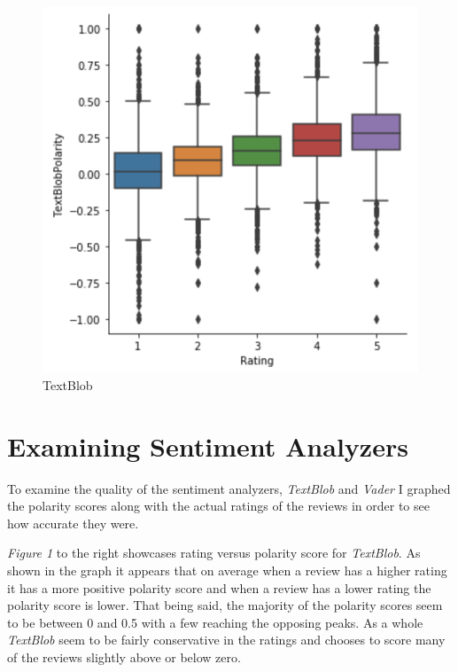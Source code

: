\documentclass[a4paper, 11pt]{article}
\begin{document}
\begin{figure} %
    \vspace{7mm}
    \centering
    \caption{TextBlob}
    \includegraphics[width=\linewidth, trim=1 1 1 1,clip]{SentimentTextBlob.png}
\end{figure}

\section*{Examining Sentiment Analyzers}
To examine the quality of the sentiment analyzers, \emph{TextBlob} and \emph{Vader} I graphed the polarity scores along with the actual ratings of the reviews in order to see how accurate they were. 

\noindent
\emph{Figure 1} to the right showcases rating versus polarity score for \emph{TextBlob}. As shown in the graph it appears that on average when a review has a higher rating it has a more positive polarity score and when a review has a lower rating the polarity score is lower. That being said, the majority of the polarity scores seem to be between 0 and 0.5 with a few reaching the opposing peaks. As a whole \emph{TextBlob} seem to be fairly conservative in the ratings and chooses to score many of the reviews slightly above or below zero.
\end{document}
